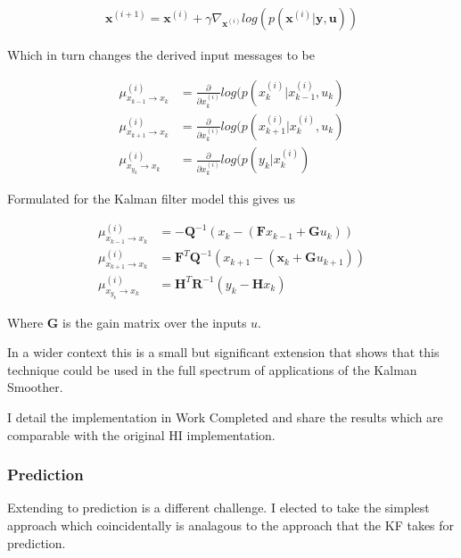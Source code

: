 \documentclass[]{../resources/final_report}
\begin{document}
\begin{align}
  \textbf{x}^{(i+1)} = \textbf{x}^{(i)} + \gamma \nabla_{\textbf{x}^{(i)}}log(p(\textbf{x}^{(i)} | \textbf{y}, \textbf{u}))
\end{align}


Which in turn changes the derived input messages to be 

\begin{align}
  \mu_{x_{k-1} \rightarrow x_k}^{(i)} &= \frac{\partial}{\partial x_k^{(i)}} log(p(x_k^{(i)}|x_{k-1}^{(i)}, u_{k})\\
  \mu_{x_{k+1} \rightarrow x_k}^{(i)} &= \frac{\partial}{\partial x_k^{(i)}} log(p(x_{k+1}^{(i)}|x_{k}^{(i)}, u_{k})\\
  \mu_{x_{y_k} \rightarrow x_k}^{(i)} &= \frac{\partial}{\partial x_k^{(i)}} log(p(y_{k}|x_{k}^{(i)})
\end{align}


Formulated for the Kalman filter model this gives us

\begin{align}
  \mu_{x_{k-1} \rightarrow x_k}^{(i)} &= -\textbf{Q}^{-1}(x_k - (\textbf{F}x_{k-1} +\textbf{G}u_k))\\
  \mu_{x_{k+1} \rightarrow x_k}^{(i)} &= \textbf{F}^T\textbf{Q}^{-1}(x_{k+1} - (\textbf{x}_k + \textbf{G}u_{k+1}))\\
  \mu_{x_{y_k} \rightarrow x_k}^{(i)} &= \textbf{H}^T\textbf{R}^{-1}(y_k - \textbf{H}x_k)
\end{align}

Where $\textbf{G}$ is the gain matrix over the inputs $u$.

In a wider context this is a small but significant extension that shows that this technique could be used in the full spectrum of applications of the Kalman Smoother. 

I detail the implementation in Work Completed and share the results which are comparable with the original HI implementation.

\pagebreak
\subsubsection{Prediction}

Extending to prediction is a different challenge. I elected to take the simplest approach which coincidentally is analagous to the approach that the KF takes for prediction.
\end{document}
